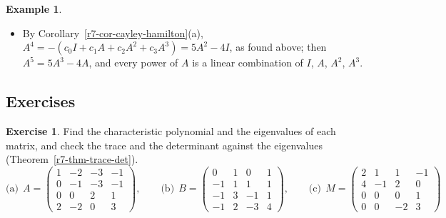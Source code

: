 \documentclass[12pt]{article}
\theoremstyle{definition}
\newtheorem{example}[theorem]{Example}
\newtheorem{exercise}{Exercise}
\begin{document}
\begin{example}
\begin{itemize}
\[\]
Check: row \(1\) of \(AA^{-1}\) is \(\frac12(2+2+0-2,\ 4+6-2-8,\ -4-8+4+8,\ -4-4+2+6)=(1,0,0,0)\), and likewise rows
\(2\), \(3\), \(4\) are \(e_2'\), \(e_3'\), \(e_4'\).
\item By Corollary~\ref{r7-cor-cayley-hamilton}(a), \(A^4=-(c_0I+c_1A+c_2A^2+c_3A^3)=5A^2-4I\), as found above; then
\(A^5=5A^3-4A\), and every power of \(A\) is a linear combination of \(I\), \(A\), \(A^2\), \(A^3\).
\end{itemize}
\end{example}

\subsection*{Exercises}

\begin{exercise}\label{r7-dr-charpoly}
Find the characteristic polynomial and the eigenvalues of each matrix, and check the trace and the determinant against
the eigenvalues (Theorem~\ref{r7-thm-trace-det}).
\[
\text{(a)}\ \ A=\begin{pmatrix}1&-2&-3&-1\\0&-1&-3&-1\\0&0&2&1\\2&-2&0&3\end{pmatrix},\qquad
\text{(b)}\ \ B=\begin{pmatrix}0&1&0&1\\-1&1&1&1\\-1&3&-1&1\\-1&2&-3&4\end{pmatrix},\qquad
\text{(c)}\ \ M=\begin{pmatrix}2&1&1&-1\\4&-1&2&0\\0&0&0&1\\0&0&-2&3\end{pmatrix}
\]
\end{exercise}
\end{document}
